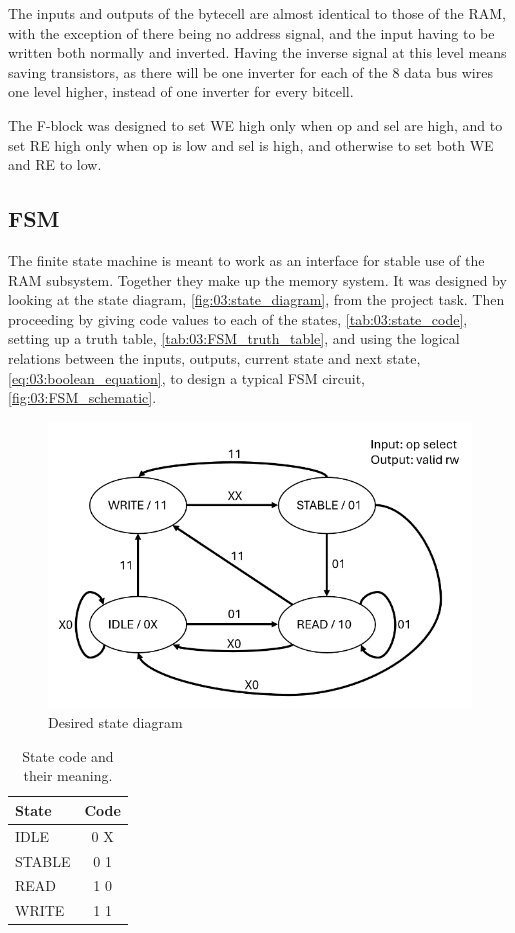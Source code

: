 The inputs and outputs of the bytecell are almost identical to those of the RAM, with the exception of there being no address signal, and the input having to be written both normally and inverted. Having the inverse signal at this level means saving transistors, as there will be one inverter for each of the 8 data bus wires one level higher, instead of one inverter for every bitcell.

The F-block was designed to set WE high only when op and sel are high, and to set RE high only when op is low and sel is high, and otherwise to set both WE and RE to low.

\subsection{FSM}
The finite state machine is meant to work as an interface for stable use of the RAM subsystem. Together they make up the memory system. It was designed by looking at the state diagram, \autoref{fig:03:state_diagram}, from the project task. Then proceeding by giving code values to each of the states, \autoref{tab:03:state_code}, setting up a truth table, \autoref{tab:03:FSM_truth_table}, and using the logical relations between the inputs, outputs, current state and next state, \autoref{eq:03:boolean_equation}, to design a typical FSM circuit, \autoref{fig:03:FSM_schematic}.

\begin{figure}
    \centering
    \includegraphics[width=0.7\linewidth]{LaTeX_2/Figures/state_diagram.png}
    \caption{Desired state diagram \cite{oppgavebeskrivelse}}
    \label{fig:03:state_diagram}
\end{figure}

\begin{table}[]
    \caption{State code and their meaning.}
    \centering
    \begin{tabular}{|l|c|}
        \hline
        State   &   Code    \\  \hline
        IDLE    &   0 X     \\  
        STABLE  &   0 1     \\
        READ    &   1 0     \\
        WRITE   &   1 1     \\  \hline
    \end{tabular}
    \label{tab:03:state_code}
\end{table}

